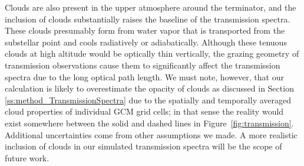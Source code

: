 \documentclass[11pt,numberedappendix,twocolappendix,]{emulateapj}
\begin{document}
Clouds are also present in the upper atmosphere around the terminator, and the inclusion of clouds substantially raises the baseline of the transmission spectra. 
%
These clouds presumably form from water vapor that is transported from the substellar point and cools radiatively or adiabatically. 
%
%
Although these tenuous clouds at high altitude would be optically thin vertically, the grazing geometry of transmission observations cause them to significantly affect the transmission spectra due to the long optical path length. 
We must note, however, that our calculation is likely to overestimate the opacity of clouds as discussed in Section \ref{ss:method_TransmissionSpectra} due to the spatially and temporally averaged cloud properties of individual GCM grid cells; 
in that sense the reality would exist somewhere between the solid and dashed lines in Figure~\ref{fig:transmission}.
Additional uncertainties come from other assumptions we made. 
A more realistic inclusion of clouds in our simulated transmission spectra will be the scope of future work. 
\end{document}
